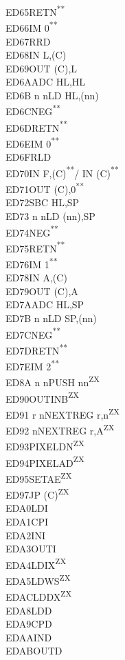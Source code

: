 \documentclass[twoside,openright,a4paper]{book}
\newcommand{\UNDOC}{\textnormal{\textsuperscript{**}}}
\newcommand{\ZXN}{\textnormal{\textsuperscript{ZX}}}
\begin{document}
\begin{multicols}{3}
{\begin{tabbing}
	ED65\>RETN\UNDOC\\
	ED66\>IM 0\UNDOC\\
	ED67\>RRD\\
	ED68\>IN L,(C)\\
	ED69\>OUT (C),L\\
	ED6A\>ADC HL,HL\\
	ED6B n n\>LD HL,(nn)\\
	ED6C\>NEG\UNDOC\\
	ED6D\>RETN\UNDOC\\
	ED6E\>IM 0\UNDOC\\
	ED6F\>RLD\\
	ED70\>IN F,(C)\UNDOC / IN (C)\UNDOC\\
	ED71\>OUT (C),0\UNDOC\\
	ED72\>SBC HL,SP\\
	ED73 n n\>LD (nn),SP\\
	ED74\>NEG\UNDOC\\
	ED75\>RETN\UNDOC\\
	ED76\>IM 1\UNDOC\\
	ED78\>IN A,(C)\\
	ED79\>OUT (C),A\\
	ED7A\>ADC HL,SP\\
	ED7B n n\>LD SP,(nn)\\
	ED7C\>NEG\UNDOC\\
	ED7D\>RETN\UNDOC\\
	ED7E\>IM 2\UNDOC\\
	ED8A n n\>PUSH nn\ZXN\\
	ED90\>OUTINB\ZXN\\
	ED91 r n\>NEXTREG r,n\ZXN\\
	ED92 n\>NEXTREG r,A\ZXN\\
	ED93\>PIXELDN\ZXN\\
	ED94\>PIXELAD\ZXN\\
	ED95\>SETAE\ZXN\\
	ED97\>JP (C)\ZXN\\
	EDA0\>LDI\\
	EDA1\>CPI\\
	EDA2\>INI\\
	EDA3\>OUTI\\
	EDA4\>LDIX\ZXN\\
	EDA5\>LDWS\ZXN\\
	EDAC\>LDDX\ZXN\\
	EDA8\>LDD\\
	EDA9\>CPD\\
	EDAA\>IND\\
	EDAB\>OUTD\\

\end{tabbing}}
\end{multicols}
\end{document}
